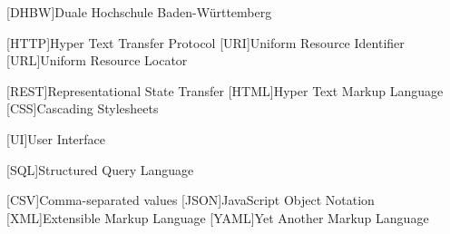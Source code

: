 
\begin{acronym}[YTMMM]
    \setlength{\itemsep}{0.8\baselineskip}

    [DHBW]{Duale Hochschule Baden-Württemberg}

    [HTTP]{Hyper Text Transfer Protocol}
    [URI]{Uniform Resource Identifier}
    [URL]{Uniform Resource Locator}

    [REST]{Representational State Transfer}
    [HTML]{Hyper Text Markup Language}
    [CSS]{Cascading Stylesheets}

    [UI]{User Interface}

    [SQL]{Structured Query Language}

    [CSV]{Comma-separated values}
    [JSON]{JavaScript Object Notation}
    [XML]{Extensible Markup Language}
    [YAML]{Yet Another Markup Language}

\end{acronym}